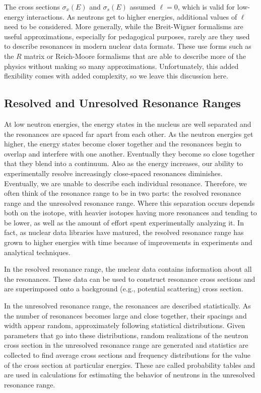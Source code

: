 The cross sections $\sigma_x(E)$ and $\sigma_s(E)$ assumed $\ell = 0$, which is valid for low-energy interactions. As neutrons get to higher energies, additional values of $\ell$ need to be considered. More generally, while the Breit-Wigner formalisms are useful approximations, especially for pedagogical purposes, rarely are they used to describe resonances in modern nuclear data formats. These use forms such as the $R$ matrix or Reich-Moore formalisms that are able to describe more of the physics without making so many approximations. Unfortunately, this added flexibility comes with added complexity, so we leave this discussion here.

\subsection{Resolved and Unresolved Resonance Ranges}

At low neutron energies, the energy states in the nucleus are well separated and the resonances are spaced far apart from each other. As the neutron energies get higher, the energy states become closer together and the resonances begin to overlap and interfere with one another. Eventually they become so close together that they blend into a continuum. Also as the energy increases, our ability to experimentally resolve increasingly close-spaced resonances diminishes. Eventually, we are unable to describe each individual resonance. Therefore, we often think of the resonance range to be in two parts: the resolved resonance range and the unresolved resonance range. Where this separation occurs depends both on the isotope, with heavier isotopes having more resonances and tending to be lower, as well as the amount of effort spent experimentally analyzing it. In fact, as nuclear data libraries have matured, the resolved resonance range has grown to higher energies with time because of improvements in experiments and analytical techniques.

In the resolved resonance range, the nuclear data contains information about all the resonances. These data can be used to construct resonance cross sections and are superimposed onto a background (e.g., potential scattering) cross section.

In the unresolved resonance range, the resonances are described statistically. As the number of resonances becomes large and close together, their spacings and width appear random, approximately following statistical distributions. Given parameters that go into these distributions, random realizations of the neutron cross section in the unresolved resonance range are generated and statistics are collected to find average cross sections and frequency distributions for the value of the cross section at particular energies. These are called probability tables and are used in calculations for estimating the behavior of neutrons in the unresolved resonance range.

